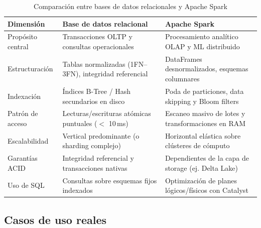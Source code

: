 \documentclass[conference,a4paper]{IEEEtran}
\begin{document}
\begin{table}[t]
\caption{Comparación entre bases de datos relacionales y Apache Spark}
\label{tab:relacional}
\centering
\footnotesize
\begin{tabular}{@{}>{\raggedright\arraybackslash}p{1.7cm}>{\raggedright\arraybackslash}p{2.4cm}>{\raggedright\arraybackslash}p{2.4cm}@{}}
\toprule
\textbf{Dimensión} & \textbf{Base de datos relacional} & \textbf{Apache Spark} \\
\midrule
Propósito central & Transacciones OLTP y consultas operacionales & Procesamiento analítico OLAP y ML distribuido \\
Estructuración & Tablas normalizadas (1FN--3FN), integridad referencial & DataFrames desnormalizados, esquemas columnares \\
Indexación & Índices B-Tree / Hash secundarios en disco & Poda de particiones, data skipping y Bloom filters \\
Patrón de acceso & Lecturas/escrituras atómicas puntuales ($<$ 10\,ms) & Escaneo masivo de lotes y transformaciones en RAM \\
Escalabilidad & Vertical predominante (o sharding complejo) & Horizontal elástica sobre clústeres de cómputo \\
Garantías ACID & Integridad referencial y transacciones nativas & Dependientes de la capa de storage (ej. Delta Lake) \\
Uso de SQL & Consultas sobre esquemas fijos indexados & Optimización de planes lógicos/físicos con Catalyst \\
\bottomrule
\end{tabular}
\vspace{-5pt}
\end{table}

\subsection{Casos de uso reales}
\end{document}
